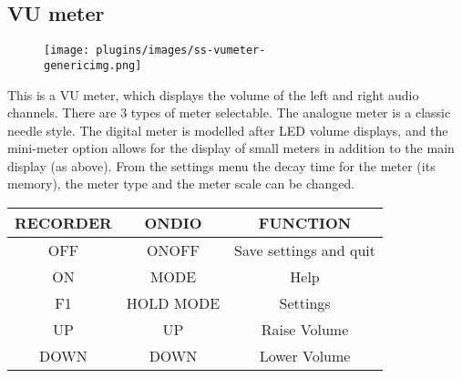 \subsection{VU meter}
\begin{figure}[h!]
\begin{center}
\texttt{[image: plugins/images/ss-vumeter-\\genericimg.png]}
\end{center}
\end{figure}

This is a VU meter, which displays the volume of the left and right
audio channels. There are 3 types of meter selectable.  The analogue
meter is a classic needle style.  The digital meter is modelled after
LED volume displays, and the mini{}-meter option allows for the display
of small meters in addition to the main display (as above).  From the
settings menu the decay time for the meter (its memory), the meter type
and the meter scale can be changed. 

\begin{table}[h!]
\begin{tabular}{|c|c|c|}
\hline
RECORDER & ONDIO & FUNCTION \\\hline
OFF & ONOFF & Save settings and quit \\\hline
ON & MODE & Help \\\hline
F1 & HOLD MODE & Settings \\\hline
UP & UP & Raise Volume \\\hline
DOWN & DOWN & Lower Volume \\\hline
\end{tabular}
\end{table}

